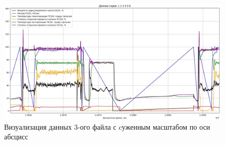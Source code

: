{  \begin{figure}
    \centering
    \def\svgwidth{\textwidth}
    \includegraphics[scale=0.6]{images/forGeneral/data_3_visual.jpg}
    \caption{ Визуализация данных 3-ого файла с cуженным масштабом по оси абсцисс}
    \label{fig:Data3Visual}
  \end{figure} 

}